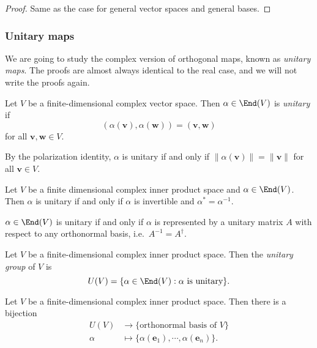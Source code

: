 \documentclass[a4paper]{article}
\begin{document}
\begin{proof}
  Same as the case for general vector spaces and general bases.
\end{proof}

\subsubsection*{Unitary maps}
We are going to study the complex version of orthogonal maps, known as \emph{unitary maps}. The proofs are almost always identical to the real case, and we will not write the proofs again.

\begin{defi}
  Let $V$ be a finite-dimensional complex vector space. Then $\alpha \in \End(V)$ is \emph{unitary} if
  \[
    (\alpha(\mathbf{v}), \alpha(\mathbf{w})) = (\mathbf{v}, \mathbf{w})
  \]
  for all $\mathbf{v}, \mathbf{w} \in V$.
\end{defi}
By the polarization identity, $\alpha$ is unitary if and only if $\|\alpha(\mathbf{v})\| = \|\mathbf{v}\|$ for all $\mathbf{v} \in V$.

\begin{lemma}
  Let $V$ be a finite dimensional complex inner product space and $\alpha \in \End(V)$. Then $\alpha$ is unitary if and only if $\alpha$ is invertible and $\alpha^* = \alpha^{-1}$.
\end{lemma}

\begin{cor}
  $\alpha \in \End(V)$ is unitary if and only if $\alpha$ is represented by a unitary matrix $A$ with respect to any orthonormal basis, i.e.\ $A^{-1} = A^\dagger$.
\end{cor}

\begin{defi}
  Let $V$ be a finite-dimensional complex inner product space. Then the \emph{unitary group} of $V$ is
  \[
    U(V) = \{\alpha \in \End(V): \alpha\text{ is unitary}\}.
  \]
\end{defi}

\begin{prop}
  Let $V$ be a finite-dimensional complex inner product space. Then there is a bijection
  \begin{align*}
    U(V) &\to \{\text{orthonormal basis of } V\}\\
    \alpha &\mapsto \{\alpha(\mathbf{e}_1), \cdots, \alpha (\mathbf{e}_n)\}.
  \end{align*}
\end{prop}
\end{document}
